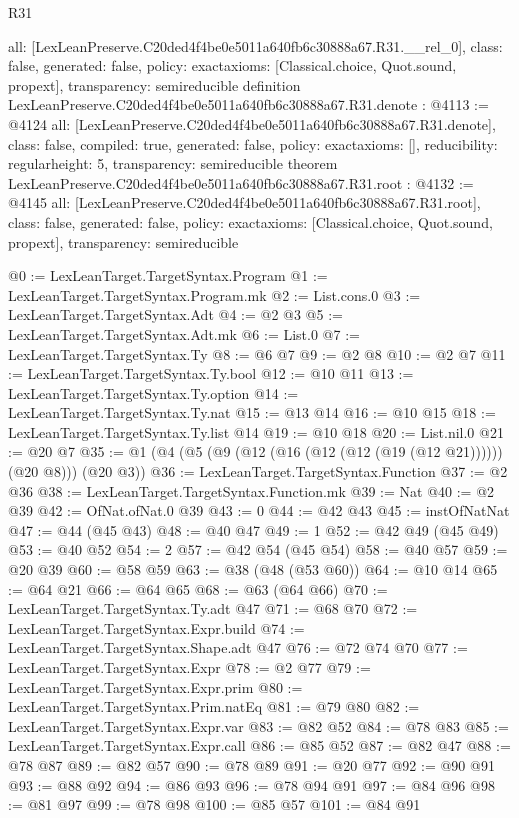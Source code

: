 \begin{lexlean}{R31}
\begin{coremodule}
{  all: [LexLeanPreserve.C20ded4f4be0e5011a640fb6c30888a67.R31.__rel_0],
  class: false,
  generated: false,
  policy: exact{axioms: [Classical.choice, Quot.sound, propext]},
  transparency: semireducible
}
definition LexLeanPreserve.C20ded4f4be0e5011a640fb6c30888a67.R31.denote : @4113 := @4124 {
  all: [LexLeanPreserve.C20ded4f4be0e5011a640fb6c30888a67.R31.denote],
  class: false,
  compiled: true,
  generated: false,
  policy: exact{axioms: []},
  reducibility: regular{height: 5},
  transparency: semireducible
}
theorem LexLeanPreserve.C20ded4f4be0e5011a640fb6c30888a67.R31.root : @4132 := @4145 {
  all: [LexLeanPreserve.C20ded4f4be0e5011a640fb6c30888a67.R31.root],
  class: false,
  generated: false,
  policy: exact{axioms: [Classical.choice, Quot.sound, propext]},
  transparency: semireducible
}

@0 := LexLeanTarget.TargetSyntax.Program
@1 := LexLeanTarget.TargetSyntax.Program.mk
@2 := List.cons.{0}
@3 := LexLeanTarget.TargetSyntax.Adt
@4 := @2 @3
@5 := LexLeanTarget.TargetSyntax.Adt.mk
@6 := List.{0}
@7 := LexLeanTarget.TargetSyntax.Ty
@8 := @6 @7
@9 := @2 @8
@10 := @2 @7
@11 := LexLeanTarget.TargetSyntax.Ty.bool
@12 := @10 @11
@13 := LexLeanTarget.TargetSyntax.Ty.option
@14 := LexLeanTarget.TargetSyntax.Ty.nat
@15 := @13 @14
@16 := @10 @15
@18 := LexLeanTarget.TargetSyntax.Ty.list @14
@19 := @10 @18
@20 := List.nil.{0}
@21 := @20 @7
@35 := @1 (@4 (@5 (@9 (@12 (@16 (@12 (@12 (@19 (@12 @21)))))) (@20 @8))) (@20 @3))
@36 := LexLeanTarget.TargetSyntax.Function
@37 := @2 @36
@38 := LexLeanTarget.TargetSyntax.Function.mk
@39 := Nat
@40 := @2 @39
@42 := OfNat.ofNat.{0} @39
@43 := 0
@44 := @42 @43
@45 := instOfNatNat
@47 := @44 (@45 @43)
@48 := @40 @47
@49 := 1
@52 := @42 @49 (@45 @49)
@53 := @40 @52
@54 := 2
@57 := @42 @54 (@45 @54)
@58 := @40 @57
@59 := @20 @39
@60 := @58 @59
@63 := @38 (@48 (@53 @60))
@64 := @10 @14
@65 := @64 @21
@66 := @64 @65
@68 := @63 (@64 @66)
@70 := LexLeanTarget.TargetSyntax.Ty.adt @47
@71 := @68 @70
@72 := LexLeanTarget.TargetSyntax.Expr.build
@74 := LexLeanTarget.TargetSyntax.Shape.adt @47
@76 := @72 @74 @70
@77 := LexLeanTarget.TargetSyntax.Expr
@78 := @2 @77
@79 := LexLeanTarget.TargetSyntax.Expr.prim
@80 := LexLeanTarget.TargetSyntax.Prim.natEq
@81 := @79 @80
@82 := LexLeanTarget.TargetSyntax.Expr.var
@83 := @82 @52
@84 := @78 @83
@85 := LexLeanTarget.TargetSyntax.Expr.call
@86 := @85 @52
@87 := @82 @47
@88 := @78 @87
@89 := @82 @57
@90 := @78 @89
@91 := @20 @77
@92 := @90 @91
@93 := @88 @92
@94 := @86 @93
@96 := @78 @94 @91
@97 := @84 @96
@98 := @81 @97
@99 := @78 @98
@100 := @85 @57
@101 := @84 @91

\end{coremodule}
\end{lexlean}
